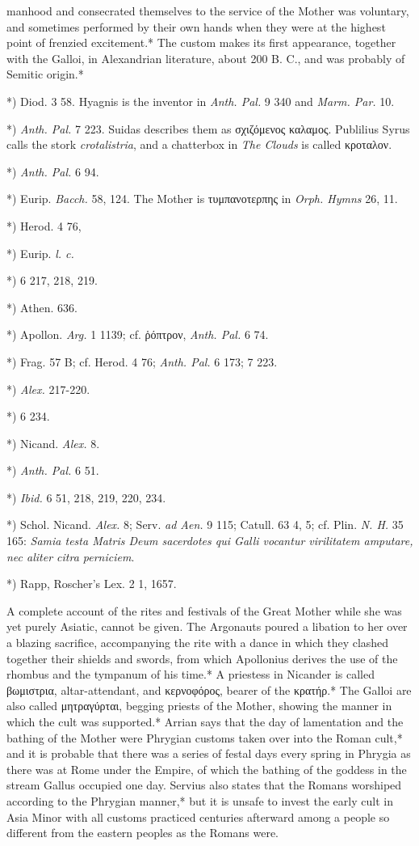\documentclass[a4paper, 11pt, oneside, polutonikogreek, english]{article}
\begin{document}
manhood and consecrated themselves to the service of the Mother was voluntary, and sometimes performed by their own hands when they were at the highest point of frenzied excitement.* The custom makes its first appearance, together with the Galloi, in Alexandrian literature, about 200 B. C., and was probably of Semitic origin.*

*) Diod. 3 58. Hyagnis is the inventor in \emph{Anth. Pal.} 9 340 and \emph{Marm. Par.} 10.

*) \emph{Anth. Pal.} 7 223. Suidas describes them as σχιζόμενος καλαμος. Publilius Syrus calls the stork \emph{crotalistria}, and a chatterbox in \emph{The Clouds} is called κροταλον.

*) \emph{Anth. Pal.} 6 94.

*) Eurip. \emph{Bacch.} 58, 124. The Mother is τυμπανοτερπης in \emph{Orph. Hymns} 26, 11.

*) Herod. 4 76,

*) Eurip. \emph{l. c.}

*) 6 217, 218, 219.

*) Athen. 636.

*) Apollon. \emph{Arg.} 1 1139; cf. ῥόπτρον, \emph{Anth. Pal.} 6 74.

*) Frag. 57 B; cf. Herod. 4 76; \emph{Anth. Pal.} 6 173; 7 223.

*) \emph{Alex.} 217-220.

*) 6 234.

*) Nicand. \emph{Alex.} 8.

*) \emph{Anth. Pal.} 6 51.

*) \emph{Ibid.} 6 51, 218, 219, 220, 234.

*) Schol. Nicand. \emph{Alex.} 8; Serv. \emph{ad Aen.} 9 115; Catull. 63 4, 5; cf. Plin. \emph{N. H.} 35 165: \emph{Samia testa Matris Deum sacerdotes qui Galli vocantur virilitatem amputare, nec aliter citra perniciem}.

*) Rapp, Roscher's Lex. 2 1, 1657.

A complete account of the rites and festivals of the Great Mother while she was yet purely Asiatic, cannot be given. The Argonauts poured a libation to her over a blazing sacrifice, accompanying the rite with a dance in which they clashed together their shields and swords, from which Apollonius derives the use of the rhombus and the tympanum of his time.* A priestess in Nicander is called βωμιστρια, altar-attendant, and κερνοφόρος, bearer of the κρατήρ.* The Galloi are also called μητραγύρται, begging priests of the Mother, showing the manner in which the cult was supported.* Arrian says that the day of lamentation and the bathing of the Mother were Phrygian customs taken over into the Roman cult,* and it is probable that there was a series of festal days every spring in Phrygia as there was at Rome under the Empire, of which the bathing of the goddess in the stream Gallus occupied one day. Servius also states that the Romans worshiped according to the Phrygian manner,* but it is unsafe to invest the early cult in Asia Minor with all customs practiced centuries afterward among a people so different from the eastern peoples as the Romans were.
\end{document}
